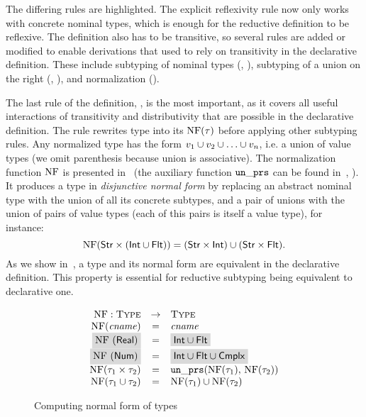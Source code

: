The differing rules are \colorbox{light-gray}{highlighted}.
The explicit reflexivity rule  now only works with 
concrete nominal types, which is enough 
for the reductive definition to be reflexive.
The definition also has to be transitive,
so several rules are added or modified to enable derivations
that used to rely on transitivity in the declarative definition.
These include subtyping of nominal types (, ),
subtyping of a union on the right (, ),
and normalization ().

The last rule of the definition, , is the most important,
as it covers all useful interactions of transitivity and distributivity 
that are possible in the declarative definition.
The rule rewrites type \ty into its  $\mathop{\mathrm{NF}}(\tau)$
before applying other subtyping rules.
Any normalized type has the form $v_1 \cup v_2 \cup \ldots \cup v_n$,
i.e. a union of value types
(we omit parenthesis because union is associative).
The normalization function $\mathop{\mathrm{NF}}$ is presented in~
(the auxiliary function $\mathop{\mathtt{un\_prs}}$ 
can be found in~, ).
It produces a type in \emph{disjunctive normal form}
by replacing an abstract nominal type 
with the union of all its concrete subtypes, 
and a pair of unions with the union of pairs of value types
(each of this pairs is itself a value type),
for instance:
\[
\mathop{\mathrm{NF}}(\mathsf{Str} \times (\mathsf{Int} \cup \mathsf{Flt})) =
(\mathsf{Str} \times \mathsf{Int}) \cup (\mathsf{Str} \times \mathsf{Flt}).
\]
As we show in~, a type and its normal form are
equivalent in the declarative definition.
This property is essential for reductive subtyping 
being equivalent to declarative one.

\begin{figure}
  \[
	\begin{array}{rcl}
	\NF: \Type &\rightarrow& \Type \\
	\NF(\cname) &=& \cname \\
	\colorbox{light-gray}{\NF(\tyreal)} &=&
	\colorbox{light-gray}{\tyunion{\tyint}{\tyflt}} \\
	\colorbox{light-gray}{\NF(\tynum)} &=&
	\colorbox{light-gray}{\tyunion{\tyunion{\tyint}{\tyflt}}{\tycmplx}} \\
	\NF(\typair{\ty_1}{\ty_2}) &=& \unprs(\NF(\ty_1), \, \NF(\ty_2))	\\
	\NF(\tyunion{\ty_1}{\ty_2}) &=& \tyunion{\NF(\ty_1)}{\NF(\ty_2)} \\
	\end{array}
  \]
	\caption{Computing normal form of \BetaJulia types}
	\label{fig:bjsem-calc-nf}
\end{figure}

